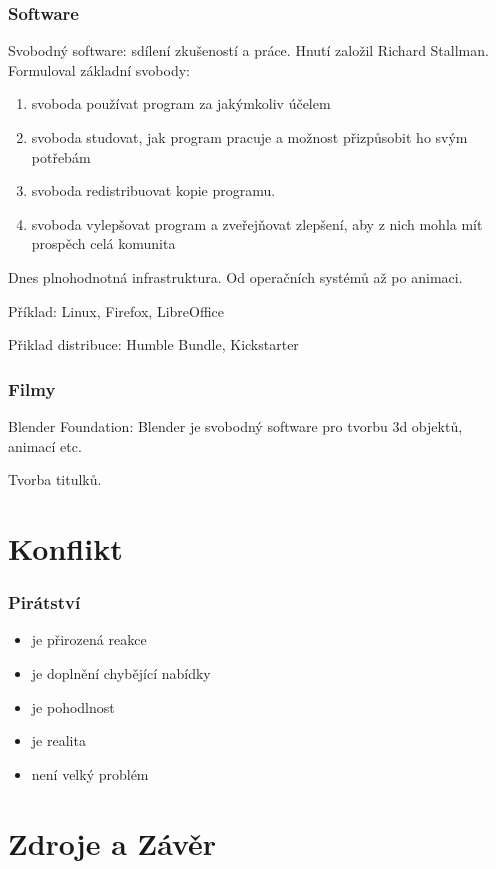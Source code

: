 \documentclass[xetex]{beamer}
\begin{document}
\begin{frame}
	\frametitle{Software}
	Svobodný software: sdílení zkušeností a práce. Hnutí založil Richard Stallman. Formuloval základní svobody:
	
	\begin{enumerate}
    \item svoboda používat program za jakýmkoliv účelem
    \item svoboda studovat, jak program pracuje a možnost přizpůsobit ho svým potřebám
    \item svoboda redistribuovat kopie programu.
    \item svoboda vylepšovat program a zveřejňovat zlepšení, aby z nich mohla mít prospěch celá komunita
	\end{enumerate}
	
	\smallskip{}
	
	Dnes plnohodnotná infrastruktura. Od operačních systémů až po animaci.
	
	\smallskip{}
	
	Příklad: Linux, Firefox, LibreOffice
	
	Přiklad distribuce: Humble Bundle, Kickstarter
\end{frame}

\begin{frame}
	\frametitle{Filmy}
	
	Blender Foundation: Blender je svobodný software pro tvorbu 3d objektů, animací etc.
	
	\bigskip
	
	Tvorba titulků.
	
\end{frame}

\section{Konflikt}

\begin{frame}
 \frametitle{Pirátství}
 \begin{itemize}
  \item je přirozená reakce
  \item je doplnění chybějící nabídky
  \item je pohodlnost
  \item je realita
  \item není velký problém
 \end{itemize}
\end{frame}

\section{Zdroje a Závěr}
\end{document}
